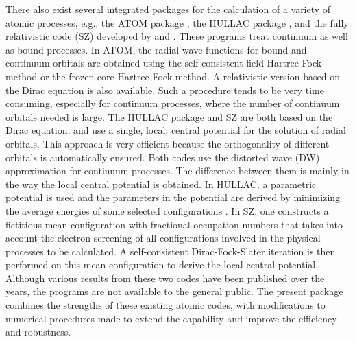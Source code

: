 There also exist several integrated packages for the calculation of a variety of
atomic processes, e.g., the ATOM package \cite{amusia:1997a}, the HULLAC package
\cite{barshalom:2001a}, and the fully relativistic code (SZ) developed by
\citet{sampson:1989a} and \citet{zhang:1989a}. These programs treat continuum as
well as bound processes. In   ATOM, the radial wave functions for bound and
continuum orbitals are obtained using the self-consistent field Hartree-Fock
method or the frozen-core Hartree-Fock method. A relativistic version based on
the Dirac equation is also available. Such a procedure tends to be very time
consuming, especially for continuum processes, where the number of continuum
orbitals needed is large. The HULLAC package and SZ are both based on the Dirac
equation, and use a single, local, central potential for the solution of radial
orbitals. This approach is very efficient because the orthogonality of 
different orbitals is automatically ensured. Both codes use the distorted wave
(DW) approximation for continuum processes. The difference between them is
mainly in the way the local central potential is obtained. In HULLAC,  a
parametric potential is used and the parameters in the potential are derived by
minimizing the average energies of some selected configurations
\cite{klapisch:1977a}. In SZ, one  constructs a fictitious mean configuration
with fractional occupation numbers that takes into account the electron
screening of all configurations involved in the physical processes to be
calculated. A self-consistent Dirac-Fock-Slater iteration is then  performed on
this mean configuration to derive the local central potential.  Although various
results from these two codes have been published over the years, the programs
are not available to the general public. The present package combines the
strengths of these existing atomic codes, with modifications to numerical
procedures made to extend the capability and improve the efficiency and
robustness.

